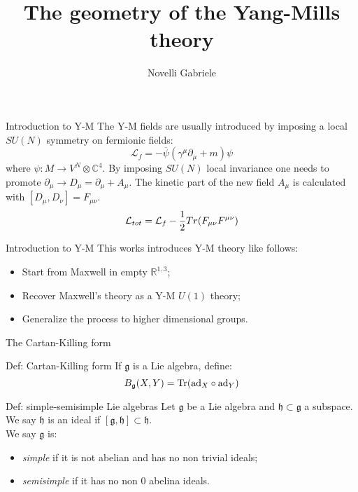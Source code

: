 \documentclass{beamer}
\title{The geometry of the Yang-Mills theory}
\author{Novelli Gabriele}
\begin{document}
\begin{frame}[plain]
    \maketitle
\end{frame}
\begin{frame}{Introduction to Y-M}
	The Y-M fields are usually introduced by imposing a local $SU(N)$ symmetry on fermionic fields:
	$$\mathcal{L}_f=-\overline{\psi}(\gamma^\mu\partial_\mu+m)\psi$$
	where $\psi:M\rightarrow V^N\otimes \mathbb{C}^4$. By imposing $SU(N)$ local invariance one needs to promote $\partial_\mu\rightarrow D_\mu=\partial_\mu+A_\mu$.
	The kinetic part of the new field $A_\mu$ is calculated with $[D_\mu,D_\nu]=F_{\mu\nu}$.
	$$\mathcal{L}_{tot}=\mathcal{L}_f-{1\over 2}Tr(F_{\mu\nu} F^{\mu\nu})$$
\end{frame}
\begin{frame}{Introduction to Y-M}
	This works introduces Y-M theory like follows:
	\begin{itemize}
		\item Start from Maxwell in empty 
		$\mathbb{R}^{1,3}$;
		\item Recover Maxwell's theory as a Y-M $U(1)$ theory;
		\item Generalize the process to higher dimensional groups. 
	\end{itemize}
\end{frame}
\begin{frame}{The Cartan-Killing form}
	\begin{exampleblock}{Def: Cartan-Killing form}
		If $\mathfrak{g}$ is a Lie algebra, define:
		$$B_\mathfrak{g}(X,Y)=\hbox{Tr}(\hbox{ad}_X\circ \hbox{ad}_Y)$$
	\end{exampleblock}
	\begin{exampleblock}{Def: simple-semisimple Lie algebras}
		Let $\mathfrak{g}$ be a Lie algebra and $\mathfrak{h}\subset \mathfrak{g}$ a subspace. We say $\mathfrak{h}$ is an ideal if $[\mathfrak{g},\mathfrak{h}]\subset\mathfrak{h}$. \\
		We say $\mathfrak{g}$ is:
		\begin{itemize}
			\item \textit{simple} if it is not abelian and has no non trivial ideals;
			\item \textit{semisimple} if it has no non 0 abelina ideals.
		\end{itemize}
	\end{exampleblock}
\end{frame}
\end{document}
